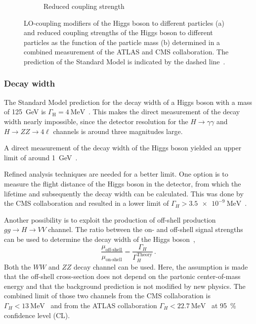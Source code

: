 \begin{figure}[htb]
\begin{subfigure}[c]{0.45\textwidth}
        \caption{Reduced coupling strength}\label{fig:theory:meas:run1:kappareduced}
    \end{subfigure}
    \caption{LO-coupling modifiers of the Higgs boson to different particles (a) and reduced coupling strengths of
             the Higgs boson to different particles as the function of the particle mass (b) determined in a combined measurement
             of the ATLAS and CMS collaboration.
             The prediction of the Standard Model is indicated by the dashed line~\cite{HiggsMuCombined}.}
\end{figure}


\subsubsection{Decay width}\label{subsub:theory:meas:run1:width}

The Standard Model prediction for the decay width of a Higgs boson with a mass of \SI{125}{\GeV} is $\Gamma_\text{H} = \SI{4}{\MeV}$~\cite{YR1}.
This makes the direct measurement of the decay width nearly impossible, since the detector resolution for the $H\to\gamma\gamma$ and
$H \to ZZ \to 4\ell$ channels is around three magnitudes large.

A direct measurement of the decay width of the Higgs boson yielded an upper limit of around \SI{1}{\GeV}~\cite{HiggsGammaDirectATLAS,HiggsGammaDirectCMS}.

Refined analysis techniques are needed for a better limit.
One option is to measure the flight distance of the Higgs boson in the detector, from which the lifetime and subsequently the decay width can be calculated.
This was done by the CMS collaboration and resulted in a lower limit of $\Gamma_H > \SI{3.5e-9}{\MeV}$~\cite{HiggsGammaLifetimeCMS}.

Another possibility is to exploit the production of off-shell production $gg \to H \to VV$ channel.
The ratio between the on- and off-shell signal strengths can be used to determine the decay width of the Higgs boson~\cite{HiggsGammaOffshellCMSZZ},
\begin{equation}
    \frac{\mu_\text{off-shell}}{\mu_\text{on-shell}} = \frac{\Gamma_H}{\Gamma_H^\text{Theory}} \,.
\end{equation}
Both the $WW$ and $ZZ$ decay channel can be used.
Here, the assumption is made that the off-shell cross-section does not depend on the partonic center-of-mass energy and that the background prediction
is not modified by new physics.
The combined limit of those two channels from the CMS collaboration is $\Gamma_H < \SI{13}{\MeV}$~\cite{HiggsGammaOffshellCMSZZ,HiggsGammaOffshellCMSWW}
and from the ATLAS collaboration $\Gamma_H < \SI{22.7}{\MeV}$~\cite{HiggsGammaOffshellATLAS} at \SI{95}{\percent} confidence level (CL).

